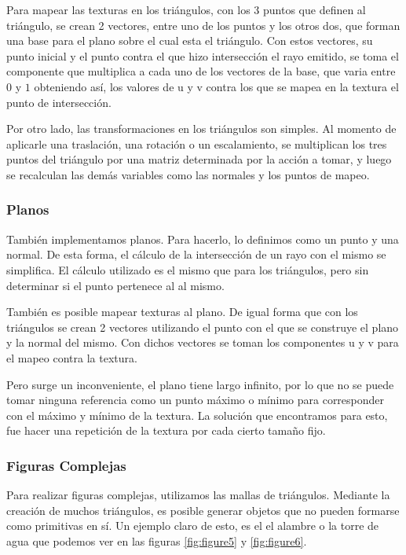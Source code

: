 \documentclass[a4paper,10pt]{article}
\begin{document}
Para mapear las texturas en los tri\'angulos, con los 3 puntos que definen al
tri\'angulo, se crean 2 vectores, entre uno de los puntos y los otros dos, que
forman una base para el plano sobre el cual esta el tri\'angulo.
Con estos vectores, su punto inicial y el punto contra el que hizo
intersecci\'on el rayo emitido, se toma el componente que multiplica a cada uno
de los vectores de la base, que varia entre $0$ y $1$ obteniendo as\'i, los
valores de u y v contra los que se mapea en la textura el punto de
intersecci\'on.

Por otro lado, las transformaciones en los tri\'angulos son simples.  Al
momento de aplicarle una traslaci\'on, una rotaci\'on o un escalamiento, se
multiplican los tres puntos del tri\'angulo por una matriz determinada por la
acci\'on a tomar, y luego se recalculan las dem\'as variables como las normales
y los puntos de mapeo.


\subsubsection{Planos}

Tambi\'en implementamos planos.  Para hacerlo, lo definimos como un punto y una
normal.  De esta forma, el c\'alculo de la intersecci\'on de un rayo con el
mismo se simplifica.  El c\'alculo utilizado es el mismo que para los
tri\'angulos, pero sin determinar si el punto pertenece al al mismo.

Tambi\'en es posible mapear texturas al plano.  De igual forma que con los
tri\'angulos se crean 2 vectores utilizando el punto con el que se construye el
plano y la normal del mismo. Con dichos vectores se toman los componentes u y v
para el mapeo contra la textura.

Pero surge un inconveniente, el plano tiene largo infinito, por lo que no se
puede tomar ninguna referencia como un punto m\'aximo o m\'inimo para
corresponder con el m\'aximo y m\'inimo de la textura. La soluci\'on que
encontramos para esto, fue hacer una repetici\'on de la textura por cada cierto
tama\~no fijo.


\subsubsection{Figuras Complejas}

Para realizar figuras complejas, utilizamos las mallas de tri\'angulos. 
Mediante la creaci\'on de muchos tri\'angulos, es posible generar objetos que
no pueden formarse como primitivas en s\'i.  Un ejemplo claro de esto, es el el
alambre o la torre de agua que podemos ver en las figuras \ref{fig:figure5} y
\ref{fig:figure6}.
\end{document}
